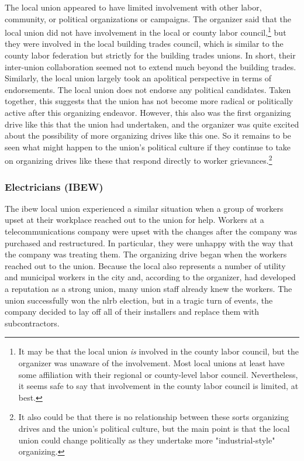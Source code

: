 \documentclass[12pt]{article}
\begin{document}
The local union appeared to have limited involvement with other labor, community, or political organizations or campaigns. The organizer said that the local union did not have involvement in the local or county labor council,\footnote{It may be that the local union \emph{is} involved in the county labor council, but the organizer was unaware of the involvement. Most local unions at least have some affiliation with their regional or county-level labor council. Nevertheless, it seems safe to say that involvement in the county labor council is limited, at best.} but they were involved in the local building trades council, which is similar to the county labor federation but strictly for the building trades unions. In short, their inter-union collaboration seemed not to extend much beyond the building trades. Similarly, the local union largely took an apolitical perspective in terms of endorsements. The local union does not endorse any political candidates. Taken together, this suggests that the union has not become more radical or politically active after this organizing endeavor. However, this also was the first organizing drive like this that the union had undertaken, and the organizer was quite excited about the possibility of more organizing drives like this one. So it remains to be seen what might happen to the union's political culture if they continue to take on organizing drives like these that respond directly to worker grievances.\footnote{It also could be that there is no relationship between these sorts organizing drives and the union's political culture, but the main point is that the local union could change politically as they undertake more "industrial-style" organizing.}

\subsubsection{Electricians (IBEW)}

The \acrshort{ibew} local union experienced a similar situation when a group of workers upset at their workplace reached out to the union for help. Workers at a telecommunications company were upset with the changes after the company was purchased and restructured. In particular, they were unhappy with the way that the company was treating them. The organizing drive began when the workers reached out to the union. Because the local also represents a number of utility and municipal workers in the city and, according to the organizer, had developed a reputation as a strong union, many union staff already knew the workers. The union successfully won the \acrshort{nlrb} election, but in a tragic turn of events, the company decided to lay off all of their installers and replace them with subcontractors. 
\end{document}
